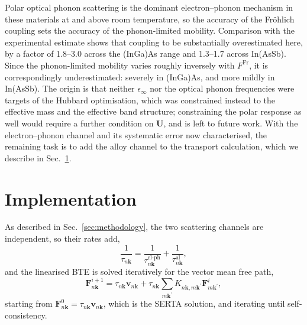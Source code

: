 \documentclass[aps,prmaterials,reprint,amsmath,amssymb,superscriptaddress]{revtex4-2}
\begin{document}
Polar optical phonon scattering is the dominant electron--phonon mechanism in these materials at and above room temperature, so the accuracy of the Fr{\"o}hlich coupling sets the accuracy of the phonon-limited mobility. Comparison with the experimental estimate shows that coupling to be substantially overestimated here, by a factor of \numrange{1.8}{3.0} across the (InGa)As range and \numrange{1.3}{1.7} across In(AsSb). Since the phonon-limited mobility varies roughly inversely with $F^\text{Fr}$, it is correspondingly underestimated: severely in (InGa)As, and more mildly in In(AsSb). The origin is that neither $\epsilon_\infty$ nor the optical phonon frequencies were targets of the Hubbard optimisation, which was constrained instead to the effective mass and the effective band structure; constraining the polar response as well would require a further condition on $\bm{U}$, and is left to future work. With the electron--phonon channel and its systematic error now characterised, the remaining task is to add the alloy channel to the transport calculation, which we describe in Sec.~\ref{sec:implementation}.


\section{Implementation}\label{sec:implementation}

As described in Sec.~\ref{sec:methodology}, the two scattering channels are independent, so their rates add,
\begin{equation}
    \frac{1}{\tau_{n\bm{k}}} = \frac{1}{\tau^\text{el-ph}_{n\bm{k}}}
    + \frac{1}{\tau^\text{al}_{n\bm{k}}},
    \label{eq:tau_total}
\end{equation}
and the linearised BTE is solved iteratively for the vector mean free path,
\begin{equation}
    \bm{F}^{i+1}_{n\bm{k}}=\tau_{n\bm{k}} \bm{v}_{n\bm{k}}
    +\tau_{n\bm{k}} \sum_{m\bm{k}^\prime} K_{n\bm{k},m\bm{k}^\prime}\bm{F}^{i}_{m\bm{k}^\prime},
    \label{eq:ITA}
\end{equation}
starting from $\bm{F}^{0}_{n\bm{k}}=\tau_{n\bm{k}}\bm{v}_{n\bm{k}}$, which is the SERTA solution, and iterating until self-consistency.
\end{document}
